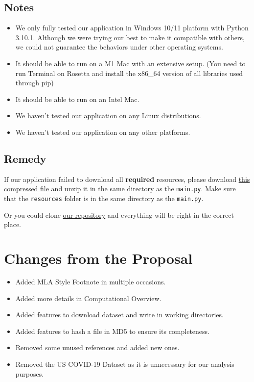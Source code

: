 \documentclass[fontsize=11pt]{article}
\begin{document}
    \subsection{Notes}

    \begin{itemize}
        \item We only fully tested our application in Windows 10/11 platform with Python 3.10.1. Although we were trying our best to make it compatible with others, we could not guarantee the behaviors under other operating systems.
        \item It should be able to run on a M1 Mac with an extensive setup. (You need to run Terminal on Rosetta and install the x86\_64 version of all libraries used through pip)
        \item It should be able to run on an Intel Mac.
        \item We haven't tested our application on any Linux distributions.
        \item We haven't tested our application on any other platforms.
    \end{itemize}

    \subsection{Remedy}

    If our application failed to download all \textbf{required} resources, please download \href{https://github.com/UofT-CS-Group/CSC110-Final-Project/raw/main/Report/remedy.zip}{this compressed file} and unzip it in the same directory as the \verb|main.py|. Make sure that the \verb|resources| folder is in the same directory as the \verb|main.py|.

    Or you could clone \href{https://github.com/UofT-CS-Group/CSC110-Final-Project}{our repository} and everything will be right in the correct place.

    \section{Changes from the Proposal}

    \begin{itemize}
        \item Added MLA Style Footnote in multiple occasions.
        \item Added more details in Computational Overview.
        \item Added features to download dataset and write in working directories.
        \item Added features to hash a file in MD5 to ensure its completeness.
        \item Removed some unused references and added new ones.
        \item Removed the US COVID-19 Dataset as it is unnecessary for our analysis purposes.
    \end{itemize}
\end{document}
